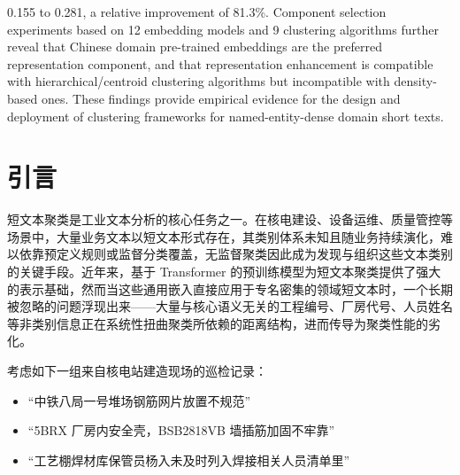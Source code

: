 \documentclass[10.5pt,compsoc,UTF8]{CjC}
\theoremstyle{mystyle}
\begin{document}
{0.155 to 0.281, a relative improvement of 81.3\%. Component selection experiments based on 12 embedding models and 9 clustering algorithms further reveal that Chinese domain pre-trained embeddings are the preferred representation component, and that representation enhancement is compatible with hierarchical/centroid clustering algorithms but incompatible with density-based ones. These findings provide empirical evidence for the design and deployment of clustering frameworks for named-entity-dense domain short texts.
\par}

\vspace {5mm}


\vskip 1mm
\songti %
\switchtwocolumn

\section{\heiti 引言}
\label{sec:intro}

短文本聚类是工业文本分析的核心任务之一。在核电建设、设备运维、质量管控等场景中，大量业务文本以短文本形式存在，其类别体系未知且随业务持续演化，难以依靠预定义规则或监督分类覆盖，无监督聚类因此成为发现与组织这些文本类别的关键手段。近年来，基于 Transformer 的预训练模型\cite{devlin2019,reimers2019}为短文本聚类提供了强大的表示基础，然而当这些通用嵌入直接应用于专名密集的领域短文本时，一个长期被忽略的问题浮现出来——大量与核心语义无关的工程编号、厂房代号、人员姓名等非类别信息正在系统性扭曲聚类所依赖的距离结构，进而传导为聚类性能的劣化。

考虑如下一组来自核电站建造现场的巡检记录：
\begin{itemize}[leftmargin=1.5em,itemsep=1pt]
  \item ``中铁八局一号堆场钢筋网片放置不规范''
  \item ``5BRX 厂房内安全壳，BSB2818VB 墙插筋加固不牢靠''
  \item ``工艺棚焊材库保管员杨入未及时列入焊接相关人员清单里''
\end{itemize}
\end{document}
